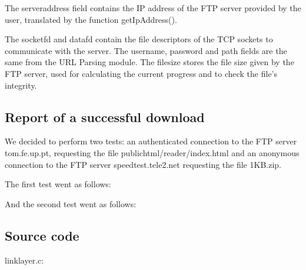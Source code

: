 \documentclass[11pt,a4paper,reqno]{article}
\numberwithin{equation}{section}
\begin{document}
	The server\textunderscore address field contains the IP address of the FTP server provided by the user, translated by the function getIpAddress().
	
	The socketfd and datafd contain the file descriptors of the TCP sockets to communicate with the server. The username, password and path fields are the same from the URL Parsing module. The file\textunderscore size stores the file size given by the FTP server, used for calculating the current progress and to check the file’s integrity.

	\subsection{Report of a successful download}

We decided to perform two tests: an authenticated connection to the FTP server tom.fe.up.pt, requesting the file public\textunderscore html/reader/index.html and an anonymous connection to the FTP server speedtest.tele2.net requesting the file 1KB.zip.

The first test went as follows:

And the second test went as follows:


\begin{appendices}

\section{Source code}

\begin{Large}
linklayer.c:
\end{Large}

\vspace{15mm}

\end{appendices}
\end{document}
